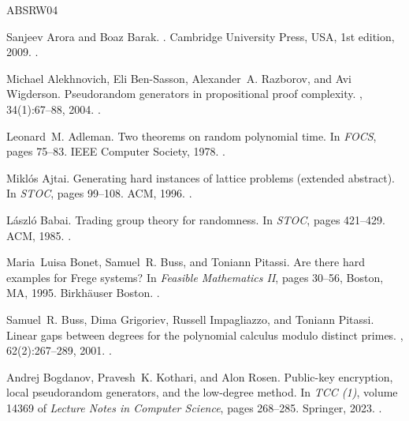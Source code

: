 \documentclass[10pt,a4paper]{article}
\theoremstyle{definition}
\theoremstyle{remark}
\begin{document}
\newcommand{\etalchar}[1]{$^{#1}$}
\begin{thebibliography}{ABSRW04}

Sanjeev Arora and Boaz Barak.
.
\newblock Cambridge University Press, USA, 1st edition, 2009.
\newblock \href {https://doi.org/10.1017/CBO9780511804090}
  {}.

Michael Alekhnovich, Eli Ben-Sasson, Alexander~A. Razborov, and Avi Wigderson.
\newblock Pseudorandom generators in propositional proof complexity.
, 34(1):67--88, 2004.
\newblock \href {https://doi.org/10.1137/S0097539701389944}
  {}.

Leonard~M. Adleman.
\newblock Two theorems on random polynomial time.
\newblock In {\em {FOCS}}, pages 75--83. {IEEE} Computer Society, 1978.
\newblock \href {https://doi.org/10.1109/SFCS.1978.37}
  {}.

Mikl{\'{o}}s Ajtai.
\newblock Generating hard instances of lattice problems (extended abstract).
\newblock In {\em {STOC}}, pages 99--108. {ACM}, 1996.
\newblock \href {https://doi.org/10.1145/237814.237838}
  {}.

L{\'{a}}szl{\'{o}} Babai.
\newblock Trading group theory for randomness.
\newblock In {\em {STOC}}, pages 421--429. {ACM}, 1985.
\newblock \href {https://doi.org/10.1145/22145.22192}
  {}.

Maria~Luisa Bonet, Samuel~R. Buss, and Toniann Pitassi.
\newblock Are there hard examples for {F}rege systems?
\newblock In {\em Feasible Mathematics II}, pages 30--56, Boston, MA, 1995.
  Birkh{\"a}user Boston.
\newblock \href {https://doi.org/10.1007/978-1-4612-2566-9_3}
  {}.

Samuel~R. Buss, Dima Grigoriev, Russell Impagliazzo, and Toniann Pitassi.
\newblock Linear gaps between degrees for the polynomial calculus modulo
  distinct primes.
, 62(2):267--289, 2001.
\newblock \href {https://doi.org/10.1006/JCSS.2000.1726}
  {}.

Andrej Bogdanov, Pravesh~K. Kothari, and Alon Rosen.
\newblock Public-key encryption, local pseudorandom generators, and the
  low-degree method.
\newblock In {\em {TCC} {(1)}}, volume 14369 of {\em Lecture Notes in Computer
  Science}, pages 268--285. Springer, 2023.
\newblock \href {https://doi.org/10.1007/978-3-031-48615-9\_10}
  {}.


\end{thebibliography}
\end{document}
